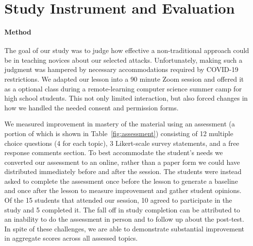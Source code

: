 \section{Study Instrument and Evaluation}
\label{SEC:evaluation}

\paragraph{Method}The goal of our study was to judge how effective a non-traditional approach
could be in teaching novices about our selected attacks.
Unfortunately, making such a judgment was hampered by
necessary accommodations
required by COVID-19 restrictions.
We adapted our lesson into
a 90 minute Zoom session and offered it as a optional class during
a remote-learning computer science summer camp for high school
students.  This not only limited interaction, but also
forced changes in how we handled the needed consent and permission forms.


We measured improvement in mastery
of the material
using
an  assessment (a portion of which is shown in Table~\ref{fig:assessment})
consisting of
12 multiple choice questions (4 for each topic),
3 Likert-scale survey statements,
and a free response comments section.
To best accommodate the student's needs we converted our
assessment to an online, rather than a paper form we could have distributed
immediately before and after the session.
The students were instead
asked to complete the assessment once before the lesson to
generate a baseline and once after the lesson to measure improvement
and gather student opinions.
Of the 15 students that attended our session, 10 agreed to participate in
the study and 5 completed it.
The fall off in study completion can be attributed to
an inability to
do the assessment in person and to
follow up about the post-test.  In spite of these
challenges, we are able to demonstrate substantial improvement in aggregate
scores across all assessed topics.







